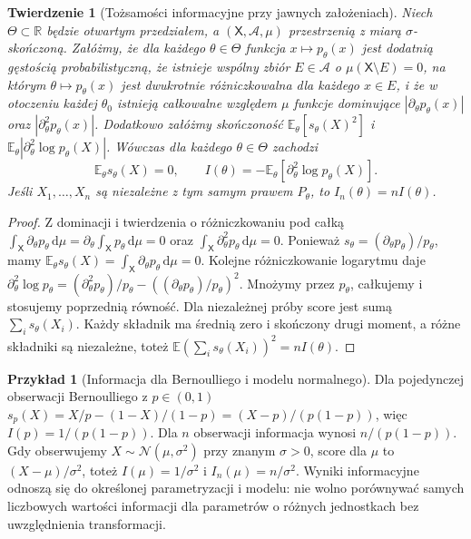\documentclass[11pt,a4paper,oneside]{report}
\numberwithin{equation}{chapter}
\theoremstyle{plain}
\newtheorem{twierdzenie}{Twierdzenie}[chapter]
\theoremstyle{definition}
\newtheorem{przyklad}{Przykład}[chapter]
\theoremstyle{remark}
\newcommand{\R}{\mathbb R}
\newcommand{\E}{\mathbb E}
\newcommand{\calA}{\mathcal A}
\newcommand{\dd}{\mathrm d}
\newcommand{\Normal}{\mathcal N}
\begin{document}
\begin{twierdzenie}[Tożsamości informacyjne przy jawnych założeniach]\label{thm:fisher-identities}
Niech $\Theta\subset\R$ będzie otwartym przedziałem, a $(\mathsf X,\calA,\mu)$
przestrzenią z miarą $\sigma$-skończoną. Załóżmy, że dla każdego
$\theta\in\Theta$ funkcja $x\mapsto p_\theta(x)$ jest dodatnią gęstością
probabilistyczną, że istnieje wspólny zbiór $E\in\calA$ o $\mu(\mathsf X\setminus E)=0$,
na którym $\theta\mapsto p_\theta(x)$ jest dwukrotnie
różniczkowalna dla każdego $x\in E$, i że w otoczeniu każdej
$\theta_0$ istnieją całkowalne względem $\mu$ funkcje dominujące
$|\partial_\theta p_\theta(x)|$ oraz $|\partial^2_\theta p_\theta(x)|$.
Dodatkowo załóżmy skończoność $\E_\theta[s_\theta(X)^2]$ i
$\E_\theta|\partial_\theta^2\log p_\theta(X)|$.
Wówczas dla każdego $\theta\in\Theta$ zachodzi
\[
\E_\theta s_\theta(X)=0,\qquad
I(\theta)=-\E_\theta[\partial_\theta^2\log p_\theta(X)].
\]
Jeśli $X_1,\ldots,X_n$ są niezależne z tym samym prawem $P_\theta$,
to $I_n(\theta)=nI(\theta)$.
\end{twierdzenie}
\begin{proof}
Z dominacji i twierdzenia o różniczkowaniu pod całką
$\int_{\mathsf X}\partial_\theta p_\theta\,\dd\mu
=\partial_\theta\int_{\mathsf X}p_\theta\,\dd\mu=0$ oraz
$\int_{\mathsf X}\partial_\theta^2p_\theta\,\dd\mu=0$.
Ponieważ $s_\theta=(\partial_\theta p_\theta)/p_\theta$, mamy
$\E_\theta s_\theta(X)=\int_{\mathsf X}\partial_\theta p_\theta\,\dd\mu=0$.
Kolejne różniczkowanie logarytmu daje
$\partial_\theta^2\log p_\theta
=(\partial_\theta^2p_\theta)/p_\theta
-((\partial_\theta p_\theta)/p_\theta)^2$.
Mnożymy przez $p_\theta$, całkujemy i stosujemy poprzednią równość.
Dla niezależnej próby score jest sumą $\sum_i s_\theta(X_i)$.
Każdy składnik ma średnią zero i skończony drugi moment, a różne składniki
są niezależne, toteż $\E(\sum_i s_\theta(X_i))^2=nI(\theta)$.
\end{proof}

\begin{przyklad}[Informacja dla Bernoulliego i modelu normalnego]
Dla pojedynczej obserwacji Bernoulliego z $p\in(0,1)$
$s_p(X)=X/p-(1-X)/(1-p)=(X-p)/(p(1-p))$, więc
$I(p)=1/(p(1-p))$. Dla $n$ obserwacji informacja wynosi
$n/(p(1-p))$. Gdy obserwujemy $X\sim\Normal(\mu,\sigma^2)$ przy znanym
$\sigma>0$, score dla $\mu$ to $(X-\mu)/\sigma^2$, toteż
$I(\mu)=1/\sigma^2$ i $I_n(\mu)=n/\sigma^2$.
Wyniki informacyjne odnoszą się do określonej parametryzacji i modelu:
nie wolno porównywać samych liczbowych wartości informacji dla parametrów
o różnych jednostkach bez uwzględnienia transformacji.
\end{przyklad}
\end{document}
